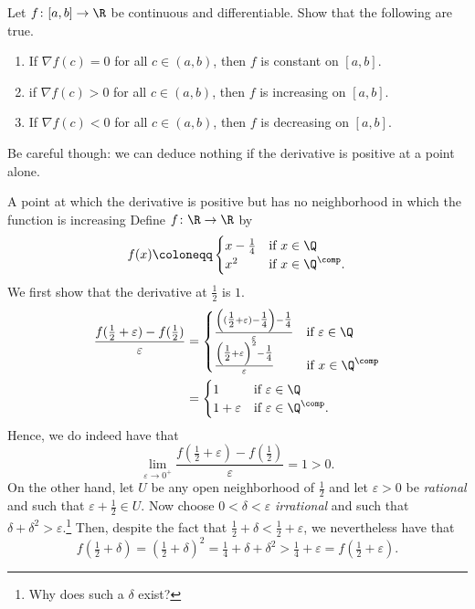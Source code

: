 \begin{exr}{}{}
Let $f\colon [a,b]\rightarrow \R$ be continuous and differentiable.  Show that the following are true.
\begin{enumerate}
\item If $\nabla f(c)=0$ for all $c\in (a,b)$, then $f$ is constant on $[a,b]$.
\item if $\nabla f(c)>0$ for all $c\in (a,b)$, then $f$ is increasing on $[a,b]$.
\item If $\nabla f(c)<0$ for all $c\in (a,b)$, then $f$ is decreasing on $[a,b]$.
\end{enumerate}
\end{exr}
Be careful though:  we can deduce nothing if the derivative is positive at a point alone.
\begin{exm}{A point at which the derivative is positive but has no neighborhood in which the function is increasing}{}
Define $f\colon \R \rightarrow \R$ by
\begin{equation}
f(x)\coloneqq \begin{cases}x-\tfrac{1}{4} & \text{if }x\in \Q \\ x^2 & \text{if }x\in \Q ^{\comp}.\end{cases}
\end{equation}
We first show that the derivative at $\frac{1}{2}$ is $1$.
\begin{equation}
\begin{split}
\frac{f(\tfrac{1}{2}+\varepsilon )-f(\tfrac{1}{2})}{\varepsilon} & =\begin{cases}\frac{\left( (\tfrac{1}{2}+\varepsilon )-\tfrac{1}{4}\right) -\tfrac{1}{4}}{\varepsilon} & \text{if }\varepsilon \in \Q \\ \frac{\left( \tfrac{1}{2}+\varepsilon \right) ^2-\tfrac{1}{4}}{\varepsilon} & \text{if }x\in \Q ^{\comp}\end{cases} \\
& =\begin{cases}1 & \text{if }\varepsilon \in \Q \\ 1+\varepsilon & \text{if }\varepsilon \in \Q ^{\comp}.\end{cases}
\end{split}
\end{equation}
Hence, we do indeed have that
\begin{equation}
\lim _{\varepsilon \to 0^+}\frac{f(\tfrac{1}{2}+\varepsilon )-f(\tfrac{1}{2})}{\varepsilon}=1>0.
\end{equation}
On the other hand, let $U$ be any open neighborhood of $\frac{1}{2}$ and let $\varepsilon >0$ be \emph{rational} and such that $\varepsilon +\frac{1}{2}\in U$.  Now choose $0<\delta <\varepsilon$ \emph{irrational} and such that $\delta +\delta ^2>\varepsilon$.\footnote{Why does such a $\delta$ exist?}  Then, despite the fact that $\frac{1}{2}+\delta <\frac{1}{2}+\varepsilon$, we nevertheless have that
\begin{equation}
f(\tfrac{1}{2}+\delta )=(\tfrac{1}{2}+\delta )^2=\tfrac{1}{4}+\delta +\delta ^2>\tfrac{1}{4}+\varepsilon =f(\tfrac{1}{2}+\varepsilon ).
\end{equation}
\end{exm}

